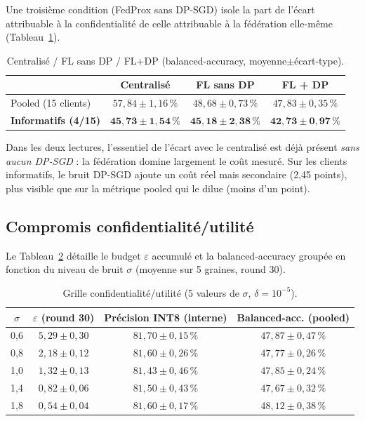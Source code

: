 \documentclass{acmart}
\begin{document}
Une troisième condition (FedProx sans DP-SGD) isole la part de l'écart attribuable à
la confidentialité de celle attribuable à la fédération elle-même
(Tableau~\ref{tab:decomp}).

\begin{table}[h!]
\centering
\small
\caption{Centralisé / FL sans DP / FL+DP (balanced-accuracy, moyenne$\pm$écart-type).}
\label{tab:decomp}
\begin{tabular}{lccc}
\toprule
 & Centralisé & FL sans DP & FL + DP \\
\midrule
Pooled (15 clients)       & $57{,}84\pm1{,}16\,\%$ & $48{,}68\pm0{,}73\,\%$ & $47{,}83\pm0{,}35\,\%$ \\
\textbf{Informatifs (4/15)} & $\mathbf{45{,}73\pm1{,}54\,\%}$ & $\mathbf{45{,}18\pm2{,}38\,\%}$ & $\mathbf{42{,}73\pm0{,}97\,\%}$ \\
\bottomrule
\end{tabular}
\end{table}

Dans les deux lectures, l'essentiel de l'écart avec le centralisé est déjà présent
\emph{sans aucun DP-SGD} : la fédération domine largement le coût mesuré. Sur les
clients informatifs, le bruit DP-SGD ajoute un coût réel mais secondaire
(2,45 points), plus visible que sur la métrique pooled qui le dilue (moins d'un
point).

\subsection{Compromis confidentialité/utilité}

Le Tableau~\ref{tab:eps} détaille le budget $\varepsilon$ accumulé et la
balanced-accuracy groupée en fonction du niveau de bruit $\sigma$ (moyenne sur
5 graines, round 30).

\begin{table}[h!]
\centering
\small
\caption{Grille confidentialité/utilité (5 valeurs de $\sigma$, $\delta=10^{-5}$).}
\label{tab:eps}
\begin{tabular}{cccc}
\toprule
$\sigma$ & $\varepsilon$ (round 30) & Précision INT8 (interne) & Balanced-acc. (pooled) \\
\midrule
0,6 & $5{,}29\pm0{,}30$ & $81{,}70\pm0{,}15\,\%$ & $47{,}87\pm0{,}47\,\%$ \\
0,8 & $2{,}18\pm0{,}12$ & $81{,}60\pm0{,}26\,\%$ & $47{,}77\pm0{,}26\,\%$ \\
1,0 & $1{,}32\pm0{,}13$ & $81{,}43\pm0{,}46\,\%$ & $47{,}85\pm0{,}24\,\%$ \\
1,4 & $0{,}82\pm0{,}06$ & $81{,}50\pm0{,}43\,\%$ & $47{,}67\pm0{,}32\,\%$ \\
1,8 & $0{,}54\pm0{,}04$ & $81{,}60\pm0{,}17\,\%$ & $48{,}12\pm0{,}38\,\%$ \\
\bottomrule
\end{tabular}
\end{table}
\end{document}

